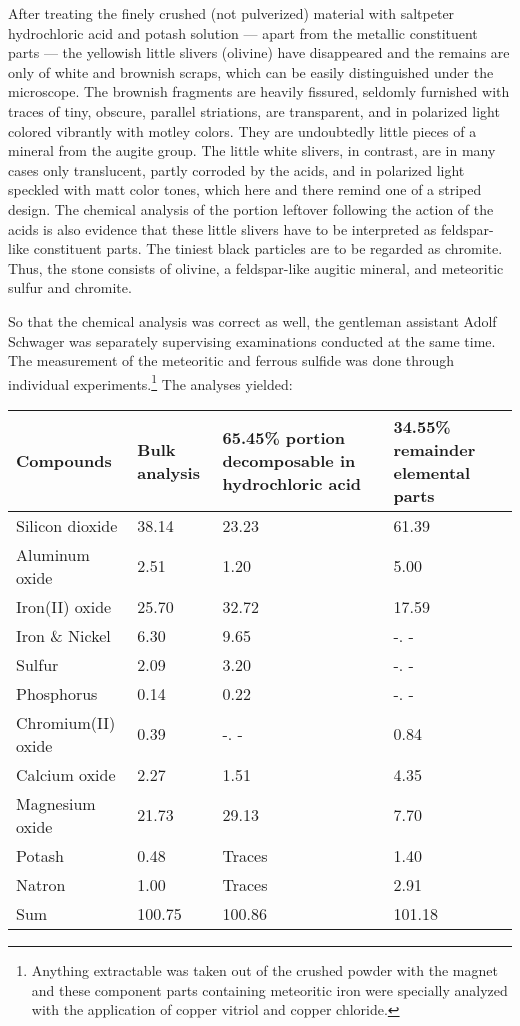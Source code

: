 \documentclass[a4paper, 12pt, oneside]{article}
\begin{document}
After treating the finely crushed (not pulverized) material with saltpeter hydrochloric acid and potash solution --- apart from the metallic constituent parts --- the yellowish little slivers (olivine) have disappeared and the remains are only of white and brownish scraps, which can be easily distinguished under the microscope. The brownish fragments are heavily fissured, seldomly furnished with traces of tiny, obscure, parallel striations, are transparent, and in polarized light colored vibrantly with motley colors. They are undoubtedly little pieces of a mineral from the augite group. The little white slivers, in contrast, are in many cases only translucent, partly corroded by the acids, and in polarized light speckled with matt color tones, which here and there remind one of a striped design. The chemical analysis of the portion leftover following the action of the acids is also evidence that these little slivers have to be interpreted as feldspar-like constituent parts. The tiniest black particles are to be regarded as chromite. Thus, the stone consists of olivine, a feldspar-like augitic mineral, and meteoritic sulfur and chromite.

So that the chemical analysis was correct as well, the gentleman assistant Adolf Schwager was separately supervising examinations conducted at the same time. The measurement of the meteoritic and ferrous sulfide was done through individual experiments.\footnote{Anything extractable was taken out of the crushed powder with the magnet and these component parts containing meteoritic iron were specially analyzed with the application of copper vitriol and copper chloride.} The analyses yielded:
\begin{center}
    \begin{tabular}{ |l|p{1.5cm}|p{3.2cm}|p{2.9cm}| }
    \hline
    Compounds & Bulk analysis & 65.45\% portion decomposable in hydrochloric acid & 34.55\% remainder elemental parts\\\hline
    Silicon dioxide & 38.14 & 23.23 & 61.39\\\hline
    Aluminum oxide & 2.51 & 1.20 & 5.00\\\hline
    Iron(II) oxide & 25.70 & 32.72 & 17.59\\\hline
    Iron \& Nickel & 6.30 & 9.65 & -. -\\\hline
    Sulfur & 2.09 & 3.20 & -. -\\\hline
    Phosphorus & 0.14 & 0.22 & -. -\\\hline
    Chromium(II) oxide & 0.39 & -. - & 0.84\\\hline
    Calcium oxide & 2.27 & 1.51 & 4.35\\\hline
    Magnesium oxide & 21.73 & 29.13 & 7.70\\\hline
    Potash & 0.48 & Traces & 1.40\\\hline
    Natron & 1.00 & Traces & 2.91\\\hline
    Sum & 100.75 & 100.86 & 101.18\\
    \hline
    \end{tabular}
\end{center}
\end{document}
